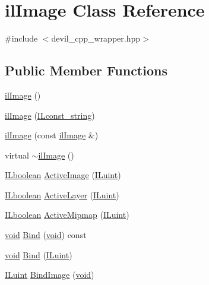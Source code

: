 \hypertarget{classil_image}{\section{il\-Image Class Reference}
\label{classil_image}
}


{\ttfamily \#include $<$devil\-\_\-cpp\-\_\-wrapper.\-hpp$>$}

\subsection*{Public Member Functions}
\begin{DoxyCompactItemize}
\item 
\hyperlink{classil_image_a67aa8d314864555f86bdb8a8e632a920}{il\-Image} ()
\item 
\hyperlink{classil_image_a707e07e32fe2cd726e00387f22d85844}{il\-Image} (\hyperlink{il_8h_a103ef32cc870d648d471aff6c7076747}{I\-Lconst\-\_\-string})
\item 
\hyperlink{classil_image_a9e4f77234e6c49233a1db081ecfb6d9a}{il\-Image} (const \hyperlink{classil_image}{il\-Image} \&)
\item 
virtual \hyperlink{classil_image_ab590401fa35e9a1220360fc0322f0426}{$\sim$il\-Image} ()
\item 
\hyperlink{il_8h_a8be80d75c2c636b9f2250fe10c2e7874}{I\-Lboolean} \hyperlink{classil_image_a4563110ae94d5ae66d010e0131ed21e4}{Active\-Image} (\hyperlink{il_8h_ac6508d0e9c19e32f32e00d54b5b8cf30}{I\-Luint})
\item 
\hyperlink{il_8h_a8be80d75c2c636b9f2250fe10c2e7874}{I\-Lboolean} \hyperlink{classil_image_a18e8fd16ffbae3b0043d9873d467d7f0}{Active\-Layer} (\hyperlink{il_8h_ac6508d0e9c19e32f32e00d54b5b8cf30}{I\-Luint})
\item 
\hyperlink{il_8h_a8be80d75c2c636b9f2250fe10c2e7874}{I\-Lboolean} \hyperlink{classil_image_a8fa919b6d16db26d05dff05d197cfa1f}{Active\-Mipmap} (\hyperlink{il_8h_ac6508d0e9c19e32f32e00d54b5b8cf30}{I\-Luint})
\item 
\hyperlink{il_8h_a5530e04d947bcddd83639ea7940faf10}{void} \hyperlink{classil_image_a1da75005c02a756c79244a70bae2e016}{Bind} (\hyperlink{il_8h_a5530e04d947bcddd83639ea7940faf10}{void}) const 
\item 
\hyperlink{il_8h_a5530e04d947bcddd83639ea7940faf10}{void} \hyperlink{classil_image_a288c6462b6e59a3fc788ca3d31bd23bb}{Bind} (\hyperlink{il_8h_ac6508d0e9c19e32f32e00d54b5b8cf30}{I\-Luint})
\item 
\hyperlink{il_8h_ac6508d0e9c19e32f32e00d54b5b8cf30}{I\-Luint} \hyperlink{classil_image_a7a5b8fd7c4a0e51a331bfa1745352074}{Bind\-Image} (\hyperlink{il_8h_a5530e04d947bcddd83639ea7940faf10}{void})

\end{DoxyCompactItemize}
